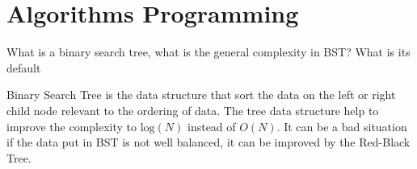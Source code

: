 \documentclass{exam}%
\newcommand*{\ANCOAALGO}{}%
\begin{document}
\ifdefined\ANCOAALGO
\newpage
\section{Algorithms Programming}
\begin{questions}

\question What is a binary search tree, what is the general complexity in BST? What is its default
\begin{solution}[.2in]
Binary Search Tree is the data structure that sort the data on the left or right child node relevant to the ordering of data. The tree data structure help to improve the complexity to $\text{log}(N)$ instead of $O(N)$. It can be a bad situation if the data put in BST is not well balanced, it can be improved by the Red-Black Tree.
\end{solution}

\end{questions}
\fi
%
%
\end{document}
